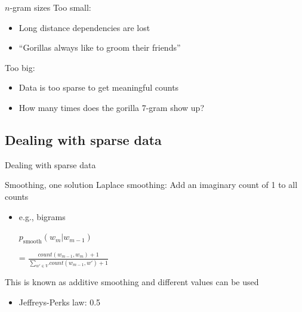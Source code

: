 \documentclass{beamer}
\begin{document}
      \begin{frame}{\subtwo}
        \begin{block}{$n$-gram sizes}
          Too small:
          \begin{itemize}
            \item Long distance dependencies are lost
            \item ``\alert{Gorillas} always like to groom \alert{their} friends''
          \end{itemize}
          Too big:
          \begin{itemize}
            \item Data is too sparse to get meaningful counts
            \item How many times does the gorilla 7-gram show up?
          \end{itemize}
        \end{block}
      \end{frame}

    \newcommand{\subthree}{Dealing with sparse data}
    \subsection{\subthree}
      \begin{frame}{\subthree}
        \begin{block}{Smoothing, one solution}
          Laplace smoothing: Add an imaginary count of 1 to all counts
          \begin{itemize}
            \item e.g., bigrams
            \item[] $p_{\text{smooth}} ( w_m | w_{m-1} )$
            \item[=] $\frac{count ( w_{m-1}, w_m ) + 1}
                           {\sum_{w' \in V}{count ( w_{m-1}, w' ) + 1}}$
          \end{itemize}
        \end{block}

        \begin{block}{}
          This is known as additive smoothing and different values can be used
          \begin{itemize}
            \item Jeffreys-Perks law: 0.5
          \end{itemize}
        \end{block}
      \end{frame}
\end{document}
